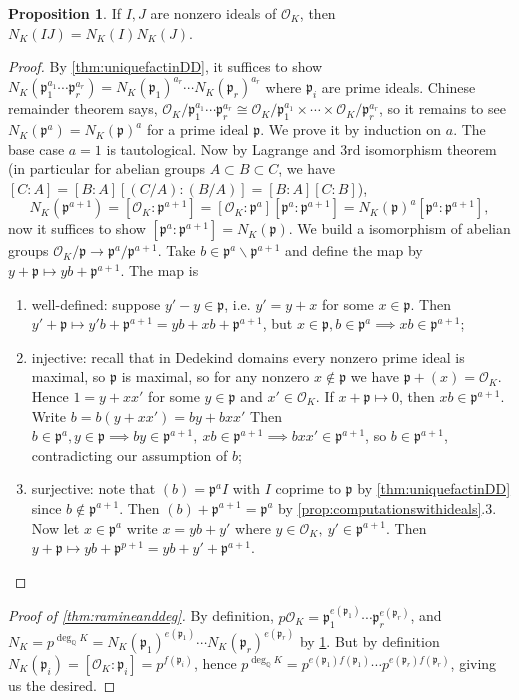 \documentclass{article}
\newcommand{\Q}{\mathbb{Q}}
\newcommand{\ri}{\mathcal{O}}
\newcommand{\ip}{\mathfrak{p}}
\theoremstyle{definition}
\newtheorem{prop}[defn]{Proposition}
\begin{document}
\begin{prop}
\label{prop:normofprodisprodofnorm}
If $I,J$ are nonzero ideals of $\ri_K$, then $N_K(IJ)=N_K(I)N_K(J)$.
\end{prop}
\begin{proof}
By \ref{thm:uniquefactinDD}, it suffices to show $N_K(\ip_1^{a_1}\cdots\ip_r^{a_r})=N_K(\ip_1)^{a_r}\cdots N_K(\ip_r)^{a_r}$ where $\ip_i$ are prime ideals. Chinese remainder theorem says, $\ri_K/\ip_1^{a_1}\cdots\ip_r^{a_r}\cong\ri_K/\ip_1^{a_1}\times\cdots\times\ri_K/\ip_r^{a_r}$, so it remains to see $N_K(\ip^a)=N_K(\ip)^a$ for a prime ideal $\ip$. We prove it by induction on $a$. The base case $a=1$ is tautological. Now by Lagrange and 3rd isomorphism theorem (in particular for abelian groups $A\subset B\subset C$, we have $[C:A]=[B:A][(C/A):(B/A)]=[B:A][C:B]$), 
\[
N_K(\ip^{a+1})=[\ri_K:\ip^{a+1}]=[\ri_K:\ip^a][\ip^a:\ip^{a+1}]=N_K(\ip)^a[\ip^a:\ip^{a+1}],
\]
now it suffices to show $[\ip^a:\ip^{a+1}]=N_K(\ip)$. We build a isomorphism of abelian groups $\ri_K/\ip\rightarrow\ip^a/\ip^{a+1}$. Take $b\in\ip^a\backslash\ip^{a+1}$ and define the map by $y+\ip\mapsto yb+\ip^{a+1}$. The map is
\begin{enumerate}
\item well-defined: suppose $y'-y\in\ip$, i.e. $y'=y+x$ for some $x\in\ip$. Then $y'+\ip\mapsto y'b+\ip^{a+1}=yb+xb+\ip^{a+1}$, but $x\in\ip,b\in\ip^a\implies xb\in\ip^{a+1}$;
\item injective: recall that in Dedekind domains every nonzero prime ideal is maximal, so $\ip$ is maximal, so for any nonzero $x\notin\ip$ we have $\ip+(x)=\ri_K$. Hence $1=y+xx'$ for some $y\in\ip$ and $x'\in\ri_K$. If $x+\ip\mapsto 0$, then $xb\in\ip^{a+1}$. Write $b=b(y+xx')=by+bxx'$ Then $b\in\ip^a,y\in\ip\implies by\in\ip^{a+1},\ xb\in\ip^{a+1}\implies bxx'\in\ip^{a+1}$, so $b\in\ip^{a+1}$, contradicting our assumption of $b$;
\item surjective: note that $(b)=\ip^aI$ with $I$ coprime to $\ip$ by \ref{thm:uniquefactinDD} since $b\notin\ip^{a+1}$. Then $(b)+\ip^{a+1}=\ip^a$ by \ref{prop:computationswithideals}.3. Now let $x\in\ip^a$ write $x=yb+y'$ where $y\in\ri_K,\ y'\in\ip^{a+1}$. Then $y+\ip\mapsto yb+\ip^{p+1}=yb+y'+\ip^{a+1}$.
\end{enumerate}
\end{proof}

\begin{proof}[Proof of \ref{thm:ramineanddeg}]
By definition, $p\ri_K=\ip_1^{e(\ip_1)}\cdots\ip_r^{e(\ip_r)}$, and $N_K=p^{\deg_\Q K}=N_K(\ip_1)^{e(\ip_1)}\cdots N_K(\ip_r)^{e(\ip_r)}$ by \ref{prop:normofprodisprodofnorm}. But by definition $N_K(\ip_i)=[\ri_K:\ip_i]=p^{f(\ip_i)}$, hence $p^{\deg_\Q K}=p^{e(\ip_1)f(\ip_1)}\cdots p^{e(\ip_r)f(\ip_r)}$, giving us the desired.
\end{proof}
\end{document}
